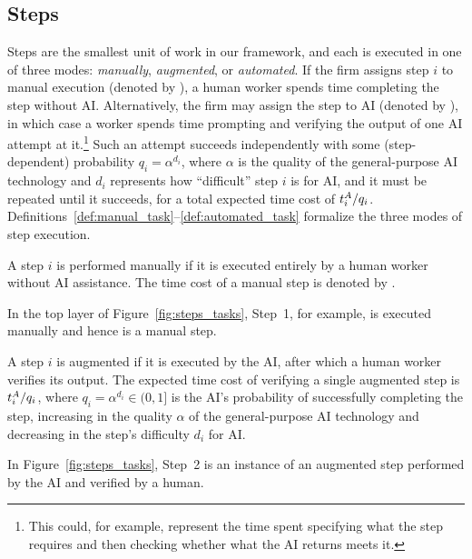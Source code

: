 \subsection{Steps}
\label{sec:model.steps}

Steps are the smallest unit of work in our framework, and each is executed in one of three modes: \emph{manually}, \emph{augmented}, or \emph{automated}.
If the firm assigns step $i$ to manual execution (denoted by \manualLetter), a human worker spends time  completing the step without AI.
Alternatively, the firm may assign the step to AI (denoted by \AIletter), in which case a worker spends time  prompting and verifying the output of one AI attempt at it.\footnote{
This could, for example, represent the time spent specifying what the step requires and then checking whether what the AI returns meets it.
}
Such an attempt succeeds independently with some (step-dependent) probability $q_i=\alpha^{d_i}$, where $\alpha$ is the quality of the general-purpose AI technology and $d_i$ represents how ``difficult'' step $i$ is for AI, and it must be repeated until it succeeds, for a total expected time cost of $t^{A}_{i}/q_i$.
Definitions~\ref{def:manual_task}--\ref{def:automated_task} formalize the three modes of step execution.

\begin{definition}
\label{def:manual_task}
A step $i$ is performed manually if it is executed entirely by a human worker without AI assistance.
The time cost of a manual step is denoted by .
\end{definition}
In the top layer of Figure~\ref{fig:steps_tasks}, Step~1, for example, is executed manually and hence is a manual step.

\begin{definition}
\label{def:augmented_task}
A step $i$ is augmented if it is executed by the AI, after which a human worker verifies its output.
The expected time cost of verifying a single augmented step is $t^{A}_{i}/q_i$, where $q_i = \alpha^{d_i} \in (0,1]$ is the AI's probability of successfully completing the step, increasing in the quality $\alpha$ of the general-purpose AI technology and decreasing in the step's difficulty $d_i$ for AI.
\end{definition}
In Figure~\ref{fig:steps_tasks}, Step~2 is an instance of an augmented step performed by the AI and verified by a human.

